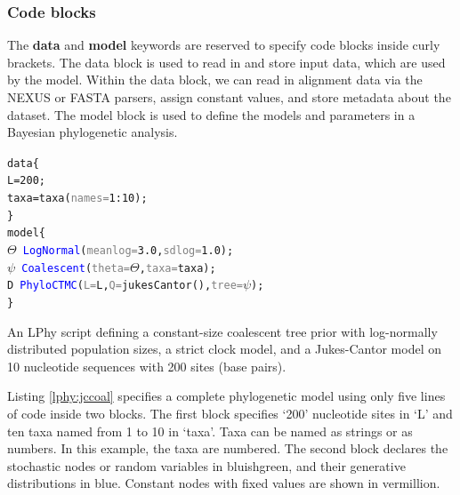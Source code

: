 \documentclass[10pt,letterpaper,table]{article}
\begin{document}
\subsubsection{Code blocks}
The \textbf{data} and \textbf{model} keywords are reserved to specify code blocks inside curly brackets. 
The data block is used to read in and store input data, which are used by the model. 
Within the data block, we can read in alignment data via the NEXUS or FASTA parsers, assign constant values, and store metadata about the dataset.
The model block is used to define the models and parameters in a Bayesian phylogenetic analysis. 

{
  \small
  \begin{listing}
    \begin{alltt}
  data \{
    L = \textcolor{constant}{200};
    taxa = \textcolor{generator}{taxa}(\textcolor{gray}{names=}\textcolor{constant}{1}:\textcolor{constant}{10});
  \}
  model \{
    \textcolor{bluishgreen}{\(\Theta\)} ~ \textcolor{blue}{LogNormal}(\textcolor{gray}{meanlog=}\textcolor{constant}{3.0}, \textcolor{gray}{sdlog=}\textcolor{constant}{1.0});
    \textcolor{bluishgreen}{\(\psi\)} ~ \textcolor{blue}{Coalescent}(\textcolor{gray}{theta=}\textcolor{bluishgreen}{\(\Theta\)}, \textcolor{gray}{taxa=}taxa);
    \textcolor{bluishgreen}{D} ~ \textcolor{blue}{PhyloCTMC}(\textcolor{gray}{L=}L, \textcolor{gray}{Q=}\textcolor{generator}{jukesCantor}(), \textcolor{gray}{tree=}\textcolor{bluishgreen}{\(\psi\)});
  \}
    \end{alltt}
    \caption{\small{An LPhy script defining a constant-size coalescent tree prior with log-normally distributed population sizes, a strict clock model, and a Jukes-Cantor model on 10 nucleotide sequences with 200 sites (base pairs).}}
    \label{lphy:jccoal}
  \end{listing}
}

\medskip{}

Listing \ref{lphy:jccoal} specifies a complete phylogenetic model using only five lines of code inside two blocks. 
The first block specifies `200' nucleotide sites in `L' and ten taxa named from 1 to 10 in `taxa'. 
Taxa can be named as strings or as numbers. 
In this example, the taxa are numbered. 
The second block declares the stochastic nodes or random variables in bluishgreen, and their generative distributions in blue. 
Constant nodes with fixed values are shown in vermillion.  
\end{document}
